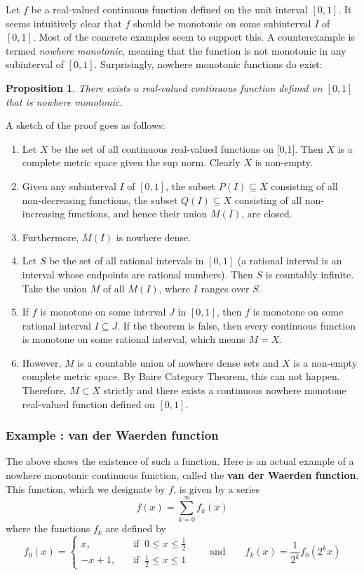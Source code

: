 \documentclass[12pt]{article}
\newtheorem{prop}{Proposition}
\begin{document}
Let $f$ be a real-valued continuous function defined on the unit interval $[0,1]$.  It seems intuitively clear that $f$ should be monotonic on some subinterval $I$ of $[0,1]$.  Most of the concrete examples seem to support this.  A counterexample is termed \emph{nowhere monotonic}, meaning that the function is not monotonic in any subinterval of $[0,1]$.  Surprisingly, nowhere monotonic functions do exist:
\begin{prop}
There exists a real-valued continuous function defined on $[0,1]$ that is nowhere monotonic.
\end{prop}

A sketch of the proof goes as follows:
\begin{enumerate}
\item Let $X$ be the set of all continuous real-valued functions on [0,1]. Then $X$ is a complete metric space given the sup norm.  Clearly $X$ is non-empty.
\item
Given any subinterval $I$ of $[0,1]$, the subset $P(I)\subseteq X$ consisting of all non-decreasing functions, the subset $Q(I)\subseteq X$ consisting of all non-increasing functions, and hence their union $M(I)$, are closed.
\item
Furthermore, $M(I)$ is nowhere dense.
\item
Let $S$ be the set of all rational intervals in $[0,1]$ (a rational interval is an interval whose endpoints are rational numbers). Then $S$ is countably infinite. Take the union $M$ of all $M(I)$, where $I$ ranges over $S$.
\item
If $f$ is monotone on some interval $J$ in $[0,1]$, then $f$ is monotone on some rational interval $I\subseteq J$. If the theorem is false, then every continuous function is monotone on some rational interval, which means $M=X$.
\item
However, $M$ is a countable union of nowhere dense sets and $X$ is a non-empty complete metric space. By Baire Category Theorem, this can not happen. Therefore, $M\subset X$ strictly and there exists a continuous nowhere monotone real-valued function defined on $[0,1]$.
\end{enumerate}

\subsubsection*{Example : van der Waerden function}  The above shows the existence of such a function.  Here is an actual example of a nowhere monotonic continuous function, called the {\bf van der Waerden function}. This function, which we designate by $f$, is given by a series
\begin{displaymath}
f(x) = \sum_{k=0}^{\infty} f_k(x)
\end{displaymath}
where the functions $f_k$ are defined by
\begin{displaymath}
f_0(x) = 
\begin{cases}
x, & \text{if}\;\; 0 \leq x \leq \frac{1}{2} \\
-x +1,\quad & \text{if}\;\; \frac{1}{2} \leq x \leq 1
\end{cases} \quad\quad \text{and} \quad\quad f_k(x) = \frac{1}{2^k}f_0(2^kx)
\end{displaymath}
\end{document}

